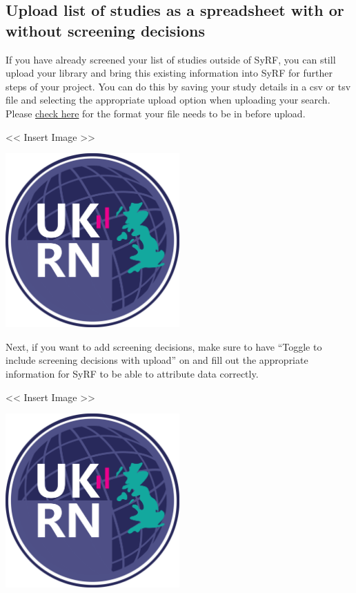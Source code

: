 \documentclass[]{book}
\begin{document}
\subsection{Upload list of studies as a spreadsheet with or without
screening
decisions}\label{upload-list-of-studies-as-a-spreadsheet-with-or-without-screening-decisions}

If you have already screened your list of studies outside of SyRF, you
can still upload your library and bring this existing information into
SyRF for further steps of your project. You can do this by saving your
study details in a csv or tsv file and selecting the appropriate upload
option when uploading your search. Please
\href{https://app.syrf.org.uk/assets/pdfs/Systematic\%20search\%20instructions.pdf}{check
here} for the format your file needs to be in before upload.

\textless{}\textless{} Insert Image \textgreater{}\textgreater{}

\includegraphics[width=0.50000\textwidth,height=0.50000\textwidth]{figs/evidence-triangle.png}

Next, if you want to add screening decisions, make sure to have ``Toggle
to include screening decisions with upload'' on and fill out the
appropriate information for SyRF to be able to attribute data correctly.

\textless{}\textless{} Insert Image \textgreater{}\textgreater{}

\includegraphics[width=0.50000\textwidth,height=0.50000\textwidth]{figs/evidence-triangle.png}
\end{document}
